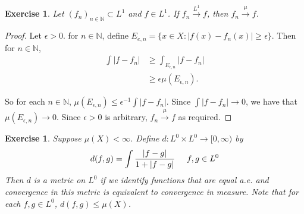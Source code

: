 \documentclass[12pt]{amsart}
\newtheorem{ex}[thm]{Exercise}
\newcommand{\ep}{\epsilon}
\newcommand{\N}{\mathbb{N}}
\newcommand{\Rg}{[0,\infty)}
\newcommand{\conv}[1]{\xrightarrow{#1}}
\begin{document}
\begin{ex}
	Let $(f_n)_{n \in \N} \subset L^1$ and $f \in L^1$. If $f_n \xrightarrow{L^1}f$, then $f_n \conv{\mu} f$.
\end{ex}

\begin{proof}
	Let $\ep >0$. for $n \in \N$, define $E_{e,n} = \{x \in X: |f(x) - f_n(x)|\geq \ep\}$. Then for $n \in \N$,
	\begin{align*}
		\int |f - f_n|
		& \geq \int_{E_{\ep,n}} |f- f_n|\\
		& \geq \ep \mu(E_{\ep,n}).
	\end{align*}
	
	So for each $n \in \N$, $\mu(E_{\ep, n}) \leq \ep^{-1}\int |f - f_n|$. Since $\int |f - f_n| \conv{} 0$, we have that $\mu(E_{\ep,n}) \conv{} 0$. Since $\ep >0$ is arbitrary, $f_n \conv{\mu} f$ as required. 
\end{proof}

\begin{ex}
	Suppose $\mu(X) < \infty$. Define $d:L^0 \times L^0 \rightarrow \Rg$ by $$d(f,g) = \int \frac{|f-g|}{1+|f-g|} \hspace{5mm} f,g \in L^0$$
	Then $d$ is a metric on $L^0$ if we identify functions that are equal a.e. and convergence in this metric is equivalent to convergence in measure. Note that for each $f,g \in L^0$, $d(f,g) \leq \mu(X)$.
\end{ex} 
\end{document}
